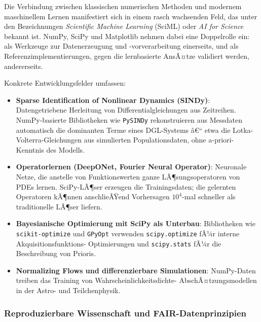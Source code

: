 \documentclass[12pt, a4paper]{article}
\begin{document}
Die Verbindung zwischen klassischen numerischen Methoden und modernem
maschinellem Lernen manifestiert sich in einem rasch wachsenden Feld,
das unter den Bezeichnungen \emph{Scientific Machine Learning} (SciML)
oder \emph{AI for Science} bekannt ist. NumPy, SciPy und Matplotlib
nehmen dabei eine Doppelrolle ein: als Werkzeuge zur Datenerzeugung und
-vorverarbeitung einerseits, und als Referenzimplementierungen, gegen
die lernbasierte AnsÃ¤tze validiert werden, andererseits.

Konkrete Entwicklungsfelder umfassen:

\begin{itemize}
  \item \textbf{Sparse Identification of Nonlinear Dynamics (SINDy)}:
    Datengetriebene Herleitung von Differentialgleichungen aus Zeitreihen.
    NumPy-basierte Bibliotheken wie \texttt{PySINDy} rekonstruieren aus
    Messdaten automatisch die dominanten Terme eines DGL-Systems â€“
    etwa die Lotka-Volterra-Gleichungen aus simulierten Populationsdaten,
    ohne a-priori-Kenntnis des Modells.

  \item \textbf{Operatorlernen (DeepONet, Fourier Neural Operator)}:
    Neuronale Netze, die anstelle von Funktionswerten ganze LÃ¶sungsoperatoren
    von PDEs lernen. SciPy-LÃ¶ser erzeugen die Trainingsdaten; die gelernten
    Operatoren kÃ¶nnen anschlieÃŸend Vorhersagen $10^4$-mal schneller als
    traditionelle LÃ¶ser liefern.

  \item \textbf{Bayesianische Optimierung mit SciPy als Unterbau}:
    Bibliotheken wie \texttt{scikit-optimize} und \texttt{GPyOpt}
    verwenden \texttt{scipy.optimize} fÃ¼r interne Akquisitionsfunktions-
    Optimierungen und \texttt{scipy.stats} fÃ¼r die Beschreibung von
    Prioris.

  \item \textbf{Normalizing Flows und differenzierbare Simulationen}:
    NumPy-Daten treiben das Training von Wahrscheinlichkeitsdichte-
    AbschÃ¤tzungsmodellen in der Astro- und Teilchenphysik.
\end{itemize}

\subsubsection{Reproduzierbare Wissenschaft und FAIR-Datenprinzipien}
\label{subsubsec:fair}
\end{document}

